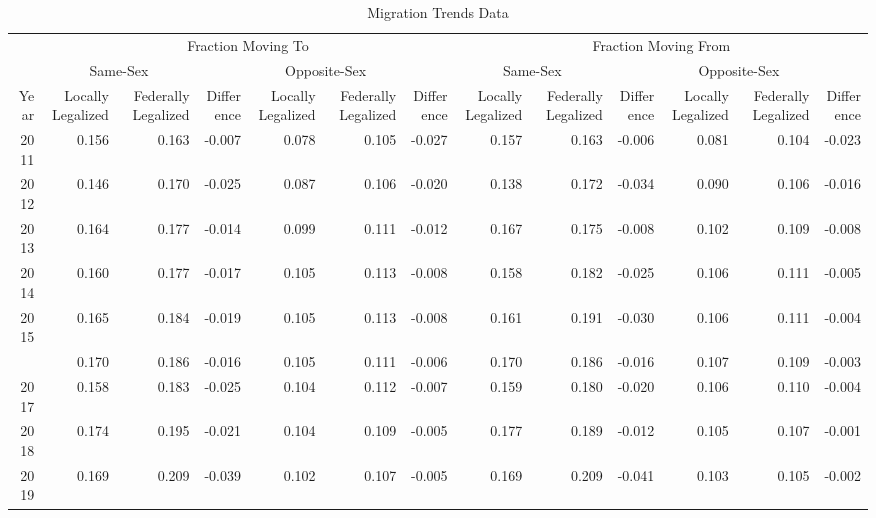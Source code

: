 \begin{table}

\caption{Migration Trends Data}
\centering
\begin{tabular}[t]{rrrrrrrrrrrrr}
\toprule
\multicolumn{1}{c}{ } & \multicolumn{6}{c}{Fraction Moving To} & \multicolumn{6}{c}{Fraction Moving From} \\
\cmidrule(l{3pt}r{3pt}){2-7} \cmidrule(l{3pt}r{3pt}){8-13}
\multicolumn{1}{c}{ } & \multicolumn{2}{c}{Same-Sex} & \multicolumn{1}{c}{ } & \multicolumn{2}{c}{Opposite-Sex} & \multicolumn{1}{c}{ } & \multicolumn{2}{c}{Same-Sex} & \multicolumn{1}{c}{ } & \multicolumn{2}{c}{Opposite-Sex} & \multicolumn{1}{c}{ } \\
\cmidrule(l{3pt}r{3pt}){2-3} \cmidrule(l{3pt}r{3pt}){5-6} \cmidrule(l{3pt}r{3pt}){8-9} \cmidrule(l{3pt}r{3pt}){11-12}
Year & Locally Legalized & Federally Legalized & Difference & Locally Legalized & Federally Legalized & Difference & Locally Legalized & Federally Legalized & Difference & Locally Legalized & Federally Legalized & Difference\\
\midrule
2011 & 0.156 & 0.163 & -0.007 & 0.078 & 0.105 & -0.027 & 0.157 & 0.163 & -0.006 & 0.081 & 0.104 & -0.023\\
2012 & 0.146 & 0.170 & -0.025 & 0.087 & 0.106 & -0.020 & 0.138 & 0.172 & -0.034 & 0.090 & 0.106 & -0.016\\
2013 & 0.164 & 0.177 & -0.014 & 0.099 & 0.111 & -0.012 & 0.167 & 0.175 & -0.008 & 0.102 & 0.109 & -0.008\\
2014 & 0.160 & 0.177 & -0.017 & 0.105 & 0.113 & -0.008 & 0.158 & 0.182 & -0.025 & 0.106 & 0.111 & -0.005\\
2015 & 0.165 & 0.184 & -0.019 & 0.105 & 0.113 & -0.008 & 0.161 & 0.191 & -0.030 & 0.106 & 0.111 & -0.004\\
\addlinespace
2016 & 0.170 & 0.186 & -0.016 & 0.105 & 0.111 & -0.006 & 0.170 & 0.186 & -0.016 & 0.107 & 0.109 & -0.003\\
2017 & 0.158 & 0.183 & -0.025 & 0.104 & 0.112 & -0.007 & 0.159 & 0.180 & -0.020 & 0.106 & 0.110 & -0.004\\
2018 & 0.174 & 0.195 & -0.021 & 0.104 & 0.109 & -0.005 & 0.177 & 0.189 & -0.012 & 0.105 & 0.107 & -0.001\\
2019 & 0.169 & 0.209 & -0.039 & 0.102 & 0.107 & -0.005 & 0.169 & 0.209 & -0.041 & 0.103 & 0.105 & -0.002\\
\bottomrule
\end{tabular}
\end{table}
